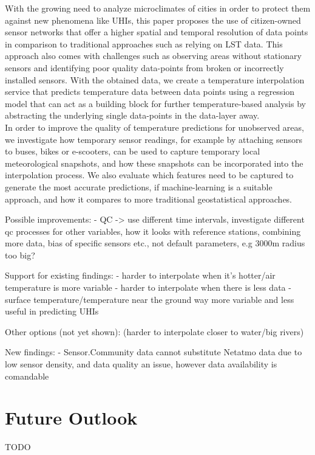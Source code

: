 With the growing need to analyze microclimates of cities in order to protect them against new phenomena like UHIs, this paper proposes the use of citizen-owned sensor networks that offer a higher spatial and temporal resolution of data points in comparison to traditional approaches such as relying on LST data. This approach also comes with challenges such as observing areas without stationary sensors and identifying poor quality data-points from broken or incorrectly installed sensors. With the obtained data, we create a temperature interpolation service that predicts temperature data between data points using a regression model that can act as a building block for further temperature-based analysis by abstracting the underlying single data-points in the data-layer away.\\
In order to improve the quality of temperature predictions for unobserved areas, we investigate how temporary sensor readings, for example by attaching sensors to buses, bikes or e-scooters, can be used to capture temporary local meteorological snapshots, and how these snapshots can be incorporated into the interpolation process. We also evaluate which features need to be captured to generate the most accurate predictions, if machine-learning is a suitable approach, and how it compares to more traditional geostatistical approaches.

Possible improvements:
- QC -> use different time intervals, investigate different qc processes for other variables, how it looks with reference stations, combining more data, bias of specific sensors etc., not default parameters, e.g 3000m radius too big?

Support for existing findings:
- harder to interpolate when it's hotter/air temperature is more variable
- harder to interpolate when there is less data
- surface temperature/temperature near the ground way more variable and less useful in predicting UHIs

Other options (not yet shown):
(harder to interpolate closer to water/big rivers)

New findings:
- Sensor.Community data cannot substitute Netatmo data due to low sensor density, and data quality an issue, however data availability is comandable


\section{Future Outlook}

TODO